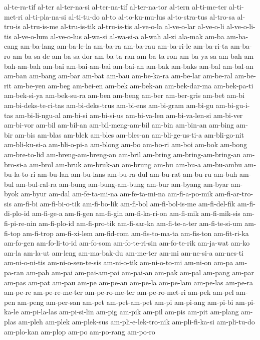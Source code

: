 {al-te-ra-tif al-ter al-ter-na-si al-ter-na-tif al-ter-na-tor al-tern
al-ti-me-ter al-ti-met-ri al-ti-pla-na-si al-ti-tu-do al-to
al-to-ku-mu-lus al-to-stra-tus al-tro-sa al-tru-is al-tru-is-me
al-tru-is-tik al-tru-is-tis al-ve-o-la al-ve-o-lar al-ve-o-li
al-ve-o-li-tis al-ve-o-lum al-ve-o-lus al-wa-si al-wa-si-a al-wah al-zi
ala-mak am-ba am-ba-cang am-ba-lang am-ba-le-la am-ba-ra am-ba-rau
am-ba-ri-le am-ba-ri-ta am-ba-ro am-ba-sa-de am-ba-sa-dor am-ba-ta-ran
am-ba-ta-ron am-ba-ya-sa am-bah am-bah-am-bah am-bai am-bai-am-bai
am-bai-an am-bak am-baks am-bal am-bal-an am-ban am-bang am-bar am-bat
am-bau am-be-ka-ra am-be-lar am-be-ral am-be-rit am-be-yen am-beg
am-bei-en am-bek am-bek-an am-bek-dar-ma am-bek-pa-ti am-bek-si-ya
am-bek-su-ra am-ben am-beng am-ber am-ber-gris am-bet am-bi
am-bi-deks-te-ri-tas am-bi-deks-trus am-bi-ens am-bi-gram am-bi-gu
am-bi-gu-i-tas am-bi-li-ngu-al am-bi-si am-bi-si-us am-bi-va-len
am-bi-va-len-si am-bi-ver am-bi-vor am-bil am-bil-an am-bil-meng-am-bil
am-bin am-bin-an am-bing am-bir am-bis am-blas am-blek am-bles am-bles-an
am-bli-ge-us-ti-a am-bli-go-nit am-bli-ku-si-a am-bli-o-pi-a am-blong
am-bo am-bo-ri am-boi am-bok am-bong am-bre-to-lid am-breng-am-breng-an
am-bril am-bring am-bring-am-bring-an am-bro-si-a am-brol am-bruk
am-bruk-an am-brung am-bu am-bu-a am-bu-ambu am-bu-la-to-ri am-bu-lan
am-bu-lans am-bu-ra-dul am-bu-rat am-bu-ru am-buh am-bul am-bul-ral-ra
am-bung am-bung-am-bung am-bur am-byang am-byar am-byok am-byur am-dal
am-fe-ta-mi-na am-fe-ta-mi-na am-fi-a-po-mik am-fi-ar-tro-sis am-fi-bi
am-fi-bi-o-tik am-fi-bo-lik am-fi-bol am-fi-bol-is-me am-fi-del-fik
am-fi-di-plo-id am-fi-ge-a am-fi-gen am-fi-gin am-fi-ka-ri-on am-fi-mik
am-fi-mik-sis am-fi-pi-re-nin am-fi-plo-id am-fi-pro-tik am-fi-sar-ka
am-fi-te-a-ter am-fi-te-si-um am-fi-top am-fi-trop am-fi-xi-lem am-fid-rom
am-fis-to-ma-ta am-fis-ton am-fit-ri-ka am-fo-gen am-fo-li-to-id am-fo-som
am-fo-te-ri-sin am-fo-te-rik am-ja-wat am-ko am-la am-la-ut am-leng
am-ma-bak-du am-me-ter am-mi am-ne-si-a am-nes-ti am-ni-o-ni-tis
am-ni-o-sen-te-sis am-ni-o-tik am-ni-o-to-mi am-ni-on am-pa am-pa-ran
am-pah am-pai am-pai-am-pai am-pai-an am-pak am-pal am-pang am-par am-pas
am-pat am-pau am-pe am-pe-an am-pe-la am-pe-lam am-pe-las am-pe-ra
am-pe-re am-pe-re-me-ter am-pe-ro-me-ter am-pe-ro-met-ri am-pek am-pel
am-pen am-peng am-per-san am-pet am-pet-am-pet am-pi am-pi-ang am-pi-bi
am-pi-ka-le am-pi-la-las am-pi-si-lin am-pig am-pik am-pil am-pis am-pit
am-plang am-plas am-pleh am-plek am-plek-sus am-pli-e-lek-tro-nik
am-pli-fi-ka-si am-pli-tu-do am-plo-kan am-plop am-po am-po-rang am-po-ro
}
